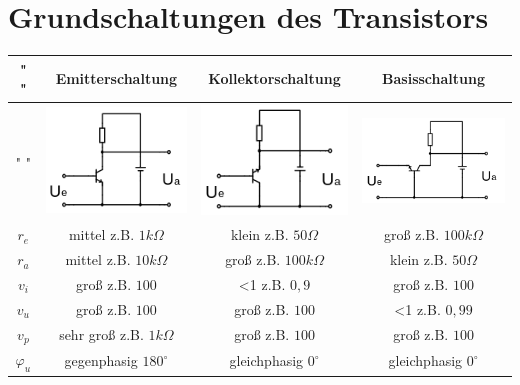 \section*{Grundschaltungen des Transistors}
\begin{frame}
	\begin{small}
	\begin{tabular}{|c|c|c|c|}
	\hline
	" " &Emitterschaltung & Kollektorschaltung & Basisschaltung \\ \hline
	" " &\includegraphics[scale=0.4]{a06/Emitterschaltung.png} & \includegraphics[scale=0.4]{a06/Kollektorschaltung.png} & \includegraphics[scale=0.4]{a06/Basisschaltung.png} \\ \hline
	$r_e$ & mittel z.B. $1k\Omega$ & klein z.B. $50\Omega$ & groß z.B. $100k\Omega$ \\ \hline
	$r_a$ & mittel z.B. $10k\Omega$ & groß z.B. $100k\Omega$ & klein z.B. $50\Omega$ \\ \hline
	$v_i$ & groß z.B. $100$ & <1 z.B. $0,9$ & groß z.B. $100$ \\ \hline
	$v_u$ & groß z.B. $100$ & groß z.B. $100$ & <1 z.B. $0,99$ \\ \hline
	$v_p$ & sehr groß z.B. $1k\Omega$ & groß z.B. $100$ & groß z.B. $100$ \\ \hline
	$\varphi_u$ & gegenphasig $180^{\circ}$ & gleichphasig $0^{\circ}$ & gleichphasig $0^{\circ}$ \\ \hline
	\end{tabular}
	\end{small}
\end{frame}

